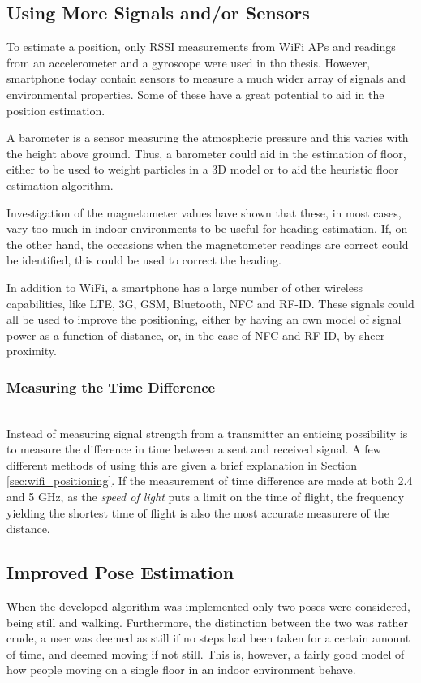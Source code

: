 \documentclass{LTHthesis}
\begin{document}
\subsection{Using More Signals and/or Sensors}
%
To estimate a position, only RSSI measurements from WiFi APs and readings from an accelerometer and a gyroscope were used in tho thesis. However, smartphone today contain sensors to measure a much wider array of signals and environmental properties. Some of these have a great potential to aid in the position estimation.

A barometer is a sensor measuring the atmospheric pressure and this varies with the height above ground. Thus, a barometer could aid in the estimation of floor, either to be used to weight particles in a 3D model or to aid the heuristic floor estimation algorithm.

Investigation of the magnetometer values have shown that these, in most cases, vary too much in indoor environments to be useful for heading estimation. If, on the other hand, the occasions when the magnetometer readings are correct could be identified, this could be used to correct the heading.

In addition to WiFi, a smartphone has a large number of other wireless capabilities, like LTE, 3G, GSM, Bluetooth, NFC and RF-ID. These signals could all be used to improve the positioning, either by having an own model of signal power as a function of distance, or, in the case of NFC and RF-ID, by sheer proximity.         

\subsubsection{Measuring the Time Difference}~\\
Instead of measuring signal strength from a transmitter an enticing possibility is to measure the difference in time between a sent and received signal. A few different methods of using this are given a brief explanation in Section \ref{sec:wifi_positioning}. If the measurement of time difference are made at both 2.4 and 5 GHz, as the \emph{speed of light} puts a limit on the time of flight, the frequency yielding the shortest time of flight is also the most accurate measurere of the distance.   
%
\subsection{Improved Pose Estimation}
%
When the developed algorithm was implemented only two poses were considered, being still and walking. Furthermore, the distinction  between the two was rather crude, a user was deemed as still if no steps had been taken for a certain amount of time, and deemed moving if not still. This is, however, a fairly good model of how people moving on a single floor in an indoor environment behave. 
\end{document}
